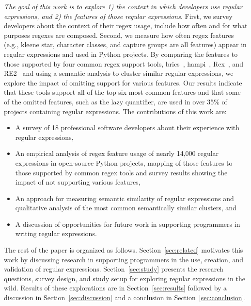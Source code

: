 \emph{The goal of this work is to explore 1) the context in which developers use regular expressions, and 2) the features of those regular expressions}.
First, we survey developers about the context of their regex usage, include how often and for what purposes regexes are composed.
Second, we measure how often regex features (e.g., kleene star, character classes, and capture groups are all features) appear in regular expressions and used in Python projects.
By comparing the features to those supported by four common regex support tools, brics~\cite{brics}, hampi~\cite{hampi}, Rex~\cite{rex}, and RE2~\cite{re2} and using a semantic analysis to cluster similar regular expressions,
we explore the impact of omitting support for various features.
Our results indicate that these tools support all of the top six most common features and that some of the omitted features, such as the lazy quantifier, are used in over 35\% of projects containing regular expressions.
The contributions of this work are:
\begin{itemize}
    \item A survey of 18 professional software developers about their experience with regular expressions,
	\item An empirical analysis of regex feature usage of nearly 14,000 regular expressions in  open-source Python projects, mapping of those features to those supported by common regex tools and survey results showing the impact of not supporting various features, 
	\item An approach for measuring semantic similarity of regular expressions and qualitative analysis of the most common semantically similar clusters, and
	\item A discussion of opportunities for future work in supporting programmers in writing regular expressions.
\end{itemize}

The rest of the paper is organized as follows. Section~\ref{sec:related} motivates this work by discussing research in supporting programmers in the use, creation, and validation of regular expressions. Section~\ref{sec:study} presents the research questions, survey design, and study setup for exploring regular expressions in the wild. Results of these explorations are in Section~\ref{sec:results} followed by a discussion in Section~\ref{sec:discussion} and a conclusion in Section~\ref{sec:conclusion}.
